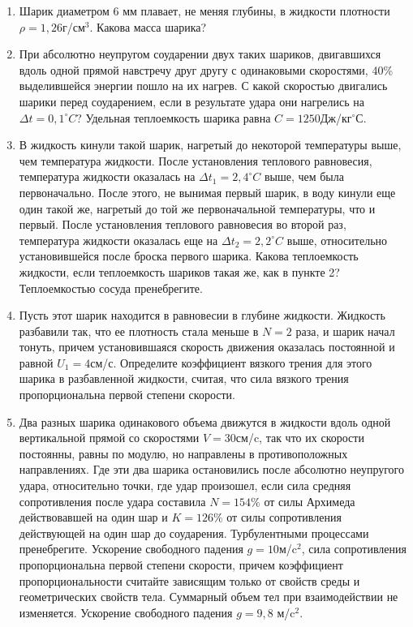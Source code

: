 
\begin{enumerate}
    \item Шарик диаметром 6 мм плавает, не меняя глубины, в жидкости плотности $\rho=1,26$г/см$^3$. Какова масса шарика?
    \item При абсолютно неупругом соударении двух таких шариков, двигавшихся вдоль одной прямой навстречу друг другу с одинаковыми скоростями, 40\% выделившейся энергии пошло на их нагрев. С какой скоростью двигались шарики перед соударением, если в результате удара они нагрелись на $\Delta t = 0,1^{\circ}C$? Удельная теплоемкость шарика равна $C=1250$Дж/кг$^{\circ}$С.
    \item В жидкость кинули такой шарик, нагретый до некоторой температуры выше, чем температура жидкости. После установления теплового равновесия, температура жидкости оказалась на $\Delta t_1 = 2,4^{\circ}C$ выше, чем была первоначально. После этого, не вынимая первый шарик, в воду кинули еще один такой же, нагретый до той же первоначальной температуры, что и первый. После установления теплового равновесия во второй раз, температура жидкости оказалась еще на $\Delta t_2 = 2,2^{\circ}C$ выше, относительно установившейся после броска первого шарика. Какова теплоемкость жидкости, если теплоемкость шариков такая же, как в пункте 2? 
    Теплоемкостью сосуда пренебрегите.
    \item Пусть этот шарик находится в равновесии в глубине жидкости. Жидкость разбавили так, что ее плотность 
    стала меньше в $N = 2$ раза, и шарик начал тонуть, причем установившаяся скорость движения оказалась постоянной и равной $U_1 = 4$см/с. Определите коэффициент вязкого трения для этого шарика в разбавленной жидкости, 
    считая, что сила вязкого трения пропорциональна первой степени скорости.
    \item Два разных шарика одинакового объема движутся в жидкости вдоль одной вертикальной прямой со скоростями 
    $V = 30$см/c, так что их скорости постоянны, равны по модулю, но направлены в противоположных направлениях. 
    Где эти два шарика остановились после абсолютно неупругого удара, относительно точки, где удар произошел, 
    если сила средняя сопротивления после удара составила $N = 154\%$ от силы Архимеда действовавшей на один шар и 
    $K = 126\%$ от силы сопротивления действующей на один шар до соударения. Турбулентными процессами пренебрегите. 
    Ускорение свободного падения $g = 10$м/c$^2$, сила сопротивления пропорциональна первой степени скорости, 
    причем коэффициент пропорциональности считайте зависящим только от свойств среды и геометрических свойств 
    тела. Суммарный объем тел при взаимодействии не изменяется. Ускорение свободного падения $g=9,8$ м/c$^2$.   
\end{enumerate}
